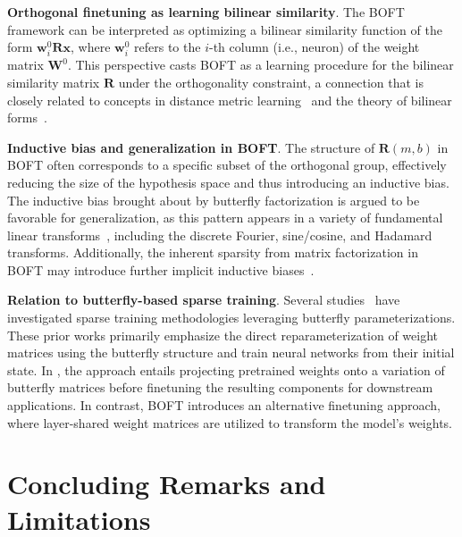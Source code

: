 \textbf{Orthogonal finetuning as learning bilinear similarity}. The BOFT framework can be interpreted as optimizing a bilinear similarity function of the form $\bm{w}^0_i\bm{R}\bm{x}$, where $\bm{w}^0_i$ refers to the $i$-th column (i.e., neuron) of the weight matrix $\bm{W}^0$. This perspective casts BOFT as a learning procedure for the bilinear similarity matrix $\bm{R}$ under the orthogonality constraint, a connection that is closely related to concepts in distance metric learning~\cite{xing2002distance} and the theory of bilinear forms~\cite{roman2005advanced}.

\textbf{Inductive bias and generalization in BOFT}. The structure of $\bm{R}(m, b)$ in BOFT often corresponds to a specific subset of the orthogonal group, effectively reducing the size of the hypothesis space and thus introducing an inductive bias. The inductive bias brought about by butterfly factorization is argued to be favorable for generalization, as this pattern appears in a variety of fundamental linear transforms~\cite{dao2019kaleidoscope}, including the discrete Fourier, sine/cosine, and Hadamard transforms. Additionally, the inherent sparsity from matrix factorization in BOFT may introduce further implicit inductive biases~\cite{gunasekar2017implicit, li2018algorithmic, liu2019neural}.

\textbf{Relation to butterfly-based sparse training}. Several studies~\cite{dao2019learning,dao2019kaleidoscope,chen2022pixelated,dao2022monarch} have investigated sparse training methodologies leveraging butterfly parameterizations. These prior works primarily emphasize the direct reparameterization of weight matrices using the butterfly structure and train neural networks from their initial state. In \cite{dao2022monarch}, the approach entails projecting pretrained weights onto a variation of butterfly matrices before finetuning the resulting components for downstream applications. In contrast, BOFT introduces an alternative finetuning approach, where layer-shared weight matrices are utilized to transform the model's weights.



\section{Concluding Remarks and Limitations}

